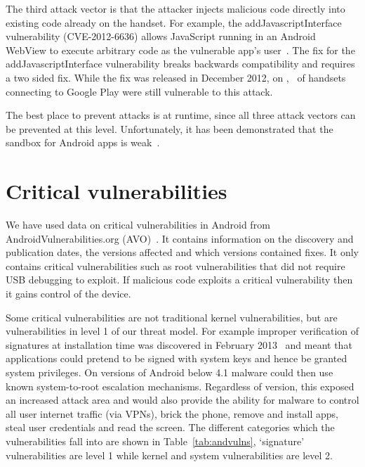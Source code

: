 \documentclass{sig-alternate}
\let\OldTodo\todo
\renewcommand{\todo}{\OldTodo[inline]}
\newcommand{\avo}{AVO}
\begin{document}
The third attack vector is that the attacker injects malicious code directly into existing code already on the handset. 
For example, the addJavascriptInterface vulnerability (CVE-2012-6636) allows JavaScript running in an Android WebView to execute arbitrary code as the vulnerable app's user~\cite{Thomas2015a}.
The fix for the addJavascriptInterface vulnerability breaks backwards compatibility and requires a two sided fix.
While the fix was released in December 2012, on \daGPAPISeventeenLaterDate, \daGPAPISeventeenEarlierProportion\ of handsets connecting to Google Play were still vulnerable to this attack.

The best place to prevent attacks is at runtime, since all three attack vectors can be prevented at this level. 
Unfortunately, it has been demonstrated that the sandbox for Android apps is weak~\cite{androidvulnerabilities.org}.


\section{Critical vulnerabilities}
We have used data on critical vulnerabilities in Android from AndroidVulnerabilities.org (\avo)~\cite{androidvulnerabilities.org}.
It contains information on the discovery and publication dates, the versions affected and which versions contained fixes.
It only contains critical vulnerabilities such as root vulnerabilities that did not require USB debugging to exploit.
If malicious code exploits a critical vulnerability then it gains control of the device.

Some critical vulnerabilities are not traditional kernel vulnerabilities, but are vulnerabilities in level 1 of our threat model.
For example improper verification of signatures at installation time was discovered in February 2013~\cite{Forristal2013} and meant that applications could pretend to be signed with system keys and hence be granted system privileges.
On versions of Android below 4.1 malware could then use known system-to-root escalation mechanisms.
Regardless of version, this exposed an increased attack area and would also provide the ability for malware to control all user internet traffic (via VPNs), brick the phone, remove and install apps, steal user credentials and read the screen.
The different categories which the vulnerabilities fall into are shown in Table~\ref{tab:andvulns}, `signature' vulnerabilities are level 1 while kernel and system vulnerabilities are level 2.\todo{What is going on with these levels?}
\avoTabAndVulns
\end{document}
